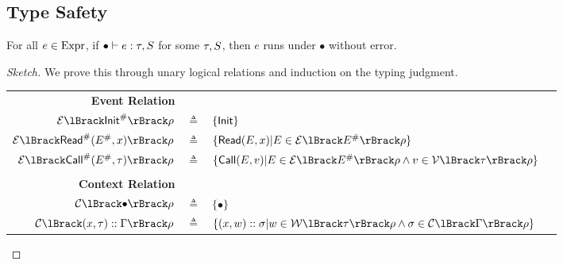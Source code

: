 \subsection{Type Safety}
\begin{theorem}\normalfont
  For all $e\in\text{Expr}$, if ${\bullet}\vdash{e}:{\tau},{S}$ for some $\tau,S$, then $e$ runs under $\bullet$ without error.
\end{theorem}
\begin{proof}[Sketch]
  We prove this through unary logical relations and induction on the typing judgment.

  \begin{tabular}{r@{\hskip2pt}c@{\hskip2pt}l@{\hskip1pt}r}
    \textbf{Event Relation}                        &              &                                                                                                                                                & \fbox{$\EvtRel{\Abs\event}\rho$}   \\
    $\EvtRel{\Abs\InitE}\rho$                      & $\triangleq$ & $\{\textsf{Init}\}$                                                                                                                                                                        \\
    $\EvtRel{\Abs\ReadE(\Abs\event,x)}\rho$        & $\triangleq$ & $\{\ReadE(\event,x)|\event\in\EvtRel{\Abs\event}\rho\}$                                                                                                                             \\
    $\EvtRel{\Abs\CallE(\Abs\event,\tau)}\rho$     & $\triangleq$ & $\{\CallE(\event,v)|\event\in\EvtRel{\Abs\event}\rho\land v\in\ValRel{\tau}\rho\}$                                                                                                  \\
    \\ 
    \textbf{Context Relation}                      &              &                                                                                                                                                & \fbox{$\CtxRel{\Gamma}\rho$}       \\
    $\CtxRel{\bullet}\rho$                         & $\triangleq$ & $\{\bullet\}$                                                                                                                                                                       \\
    $\CtxRel{(x,\tau)\cons\Gamma}\rho$             & $\triangleq$ & $\{(x,w)\cons\ctx|w\in\WalRel{\tau}\rho\land\ctx\in\CtxRel{\Gamma}\rho\}$                                                                                                           \\

\end{tabular}
\end{proof}
